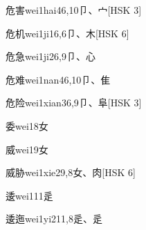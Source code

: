 \begin{EntryWithPhonetic}{危害}{wei1hai4}{6,10}{⼙、⼧}[HSK 3]
\end{EntryWithPhonetic}

\begin{EntryWithPhonetic}{危机}{wei1ji1}{6,6}{⼙、⽊}[HSK 6]
\end{EntryWithPhonetic}

\begin{EntryWithPhonetic}{危急}{wei1ji2}{6,9}{⼙、⼼}
\end{EntryWithPhonetic}

\begin{EntryWithPhonetic}{危难}{wei1nan4}{6,10}{⼙、⾫}
\end{EntryWithPhonetic}

\begin{EntryWithPhonetic}{危险}{wei1xian3}{6,9}{⼙、⾩}[HSK 3]
\end{EntryWithPhonetic}

\begin{EntryWithPhonetic}{委}{wei1}{8}{⼥}
\end{EntryWithPhonetic}

\begin{EntryWithPhonetic}{威}{wei1}{9}{⼥}
\end{EntryWithPhonetic}

\begin{EntryWithPhonetic}{威胁}{wei1xie2}{9,8}{⼥、⾁}[HSK 6]
\end{EntryWithPhonetic}

\begin{EntryWithPhonetic}{逶}{wei1}{11}{⾡}
\end{EntryWithPhonetic}

\begin{EntryWithPhonetic}{逶迤}{wei1yi2}{11,8}{⾡、⾡}
\end{EntryWithPhonetic}

